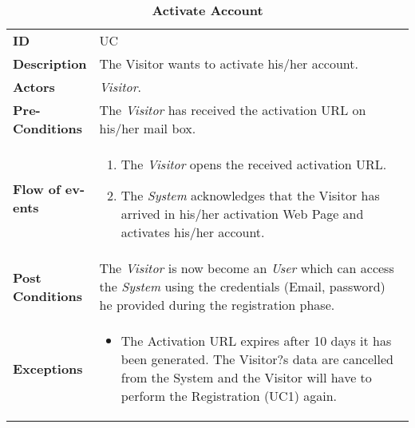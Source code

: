 \begin{longtable}{|p{0.2\linewidth} p{0.8\linewidth}|}
	\captionsetup{labelformat=empty} %
	\caption{\textbf{Activate Account}} %
	\label{UC_Activate}	\\ \hline
	
	\textbf{ID} & UC\theUseCaseIdCounter \\ \hline
	\textbf{Description} & The Visitor wants to activate his/her account. \\ \hline
	\textbf{Actors} & \emph{Visitor}.\\ \hline
	\textbf{Pre-Conditions} & The \emph{Visitor} has received the activation URL on his/her mail box. \\ \hline
	\textbf{Flow of ev-ents} & 
	\begin{enumerate}
		\item The \emph{Visitor} opens the received activation URL.
		\item The \emph{System} acknowledges that the Visitor has arrived in his/her activation Web Page and activates his/her account.
	\end{enumerate}	 \\ \hline
	\textbf{Post Conditions} & The \emph{Visitor} is now become an \emph{User} which can access the \emph{System} using the credentials (Email, password) he provided during the registration phase. \\ \hline
	\textbf{Exceptions} & 
	\begin{itemize}
		\item The Activation URL expires after 10 days it has been generated. The Visitor?s data are cancelled from the System and the Visitor will have to perform the Registration (UC1) again.
	\end{itemize} \\ \hline
\end{longtable}


